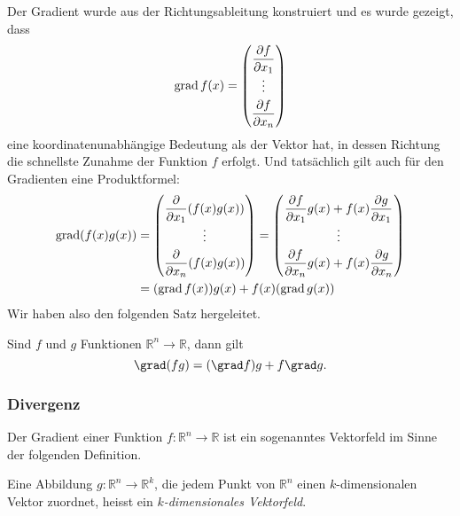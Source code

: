 Der Gradient wurde aus der Richtungsableitung konstruiert und es wurde
gezeigt, dass 
\[
\operatorname{grad} f(x)
=
\renewcommand{\arraystretch}{1.7}
\begin{pmatrix}
\displaystyle
\frac{\partial f}{\partial x_1}\\
\vdots\\
\displaystyle
\frac{\partial f}{\partial x_n}
\end{pmatrix}
\]
eine koordinatenunabhängige Bedeutung als der Vektor hat, in dessen
Richtung die schnellste Zunahme der Funktion $f$ erfolgt.
Und tatsächlich gilt auch für den Gradienten eine Produktformel:
\begin{align*}
\renewcommand{\arraystretch}{1.7}
\operatorname{grad}(f(x)g(x))
&=
\begin{pmatrix}
\displaystyle
\frac{\partial}{\partial x_1}(f(x)g(x))\\
\vdots\\
\displaystyle
\frac{\partial}{\partial x_n}(f(x)g(x))
\end{pmatrix}
=
\begin{pmatrix}
\displaystyle
\frac{\partial f}{\partial x_1} g(x)
+
f(x) \frac{\partial g}{\partial x_1}\\
\vdots\\
\displaystyle
\frac{\partial f}{\partial x_n} g(x)
+
f(x) \frac{\partial g}{\partial x_n}
\end{pmatrix}
\\
&=
(\operatorname{grad}f(x)) g(x)
+
f(x)(\operatorname{grad}g(x))
\end{align*}
Wir haben also den folgenden Satz hergeleitet.

\begin{satz}
Sind $f$ und $g$ Funktionen $\mathbb{R}^n \to\mathbb{R}$, dann gilt
\[
\grad (fg) = (\grad f)g + f\grad g.
\]
\end{satz}

%
%
\subsubsection{Divergenz}
Der Gradient einer Funktion $f\colon\mathbb{R}^n\to\mathbb{R}$ ist
ein sogenanntes Vektorfeld im Sinne der folgenden Definition.

\begin{definition}[Vektorfeld]
\label{buch:felder:fundamentallemma:def:vektorfeld}
Eine Abbildung $g\colon\mathbb{R}^n\to\mathbb{R}^k$, die jedem Punkt
von $\mathbb{R}^n$ einen $k$-dimensionalen Vektor zuordnet, heisst
ein {\em $k$-dimensionales Vektorfeld}.
\end{definition}

